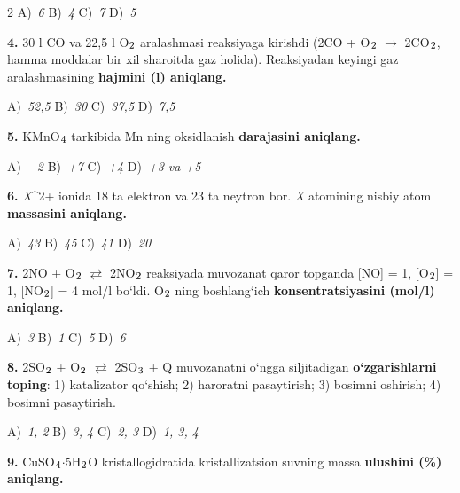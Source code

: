 \documentclass[11pt,a4paper]{article}
\renewcommand{\textsubscript}[1]{\ensuremath{_{\text{\fontsize{8}{8}\selectfont #1}}}}
\begin{document}
\begin{multicols}{2}
\noindent A)~\textsl{6} \hfill B)~\textsl{4} \hfill C)~\textsl{7} \hfill D)~\textsl{5}\par
\vspace{4pt}
\noindent\textbf{4.} 30 l CO va 22,5 l O\textsubscript{2} aralashmasi reaksiyaga kirishdi (2CO + O\textsubscript{2} $\to$ 2CO\textsubscript{2}, hamma moddalar bir xil sharoitda gaz holida). Reaksiyadan keyingi gaz aralashmasining \textbf{hajmini (l) aniqlang.}

\noindent A)~\textsl{52,5} \hfill B)~\textsl{30} \hfill C)~\textsl{37,5} \hfill D)~\textsl{7,5}\par
\vspace{4pt}
\noindent\textbf{5.} KMnO\textsubscript{4} tarkibida Mn ning oksidlanish \textbf{darajasini aniqlang.}

\noindent A)~\textsl{$-$2} \hfill B)~\textsl{+7} \hfill C)~\textsl{+4} \hfill D)~\textsl{+3 va +5}\par
\vspace{4pt}
\noindent\textbf{6.} \textit{X}\textasciicircum{}2+ ionida 18 ta elektron va 23 ta neytron bor. \textit{X} atomining nisbiy atom \textbf{massasini aniqlang.}

\noindent A)~\textsl{43} \hfill B)~\textsl{45} \hfill C)~\textsl{41} \hfill D)~\textsl{20}\par
\vspace{4pt}
\noindent\textbf{7.} 2NO + O\textsubscript{2} $\rightleftarrows$ 2NO\textsubscript{2} reaksiyada muvozanat qaror topganda [NO] = 1, [O\textsubscript{2}] = 1, [NO\textsubscript{2}] = 4 mol/l bo`ldi. O\textsubscript{2} ning boshlang`ich \textbf{konsentratsiyasini (mol/l) aniqlang.}

\noindent A)~\textsl{3} \hfill B)~\textsl{1} \hfill C)~\textsl{5} \hfill D)~\textsl{6}\par
\vspace{4pt}
\noindent\textbf{8.} 2SO\textsubscript{2} + O\textsubscript{2} $\rightleftarrows$ 2SO\textsubscript{3} + Q muvozanatni o`ngga siljitadigan \textbf{o`zgarishlarni toping}: 1) katalizator qo`shish; 2) haroratni pasaytirish; 3) bosimni oshirish; 4) bosimni pasaytirish.

\noindent A)~\textsl{1, 2} \hfill B)~\textsl{3, 4} \hfill C)~\textsl{2, 3} \hfill D)~\textsl{1, 3, 4}\par
\vspace{4pt}
\noindent\textbf{9.} CuSO\textsubscript{4}$\cdot$5H\textsubscript{2}O kristallogidratida kristallizatsion suvning massa \textbf{ulushini (\%) aniqlang.}


\end{multicols}
\end{document}
